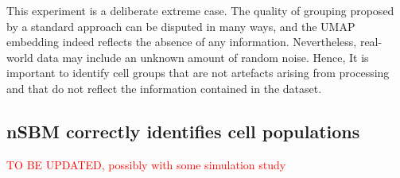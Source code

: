 \documentclass[10pt]{article}
\begin{document}
This experiment is a deliberate extreme case. The quality of grouping proposed by a standard approach can be disputed in many ways, and the UMAP embedding indeed reflects the absence of any information. Nevertheless, real-world data may include an unknown amount of random noise. Hence, It is important to identify cell groups that are not artefacts arising from processing and that do not reflect the information contained in the dataset. 

\subsection*{nSBM correctly identifies cell populations}

\textcolor{red}{TO BE UPDATED, possibly with some simulation study}


\end{document}
